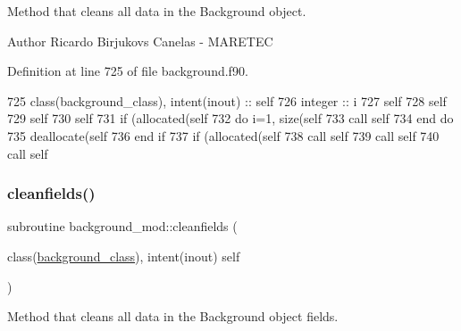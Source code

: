 Method that cleans all data in the Background object. 

\begin{DoxyAuthor}{Author}
Ricardo Birjukovs Canelas -\/ M\+A\+R\+E\+T\+EC 
\end{DoxyAuthor}


Definition at line 725 of file background.\+f90.


\begin{DoxyCode}
725     \textcolor{keywordtype}{class}(background\_class), \textcolor{keywordtype}{intent(inout)} :: self
726     \textcolor{keywordtype}{integer} :: i
727     self%
728     self%
729     self%
730     self%
731     \textcolor{keywordflow}{if} (\textcolor{keyword}{allocated}(self%
732         \textcolor{keywordflow}{do} i=1, \textcolor{keyword}{size}(self%
733             \textcolor{keyword}{call }self%
734 \textcolor{keywordflow}{        end do}
735         \textcolor{keyword}{deallocate}(self%
736 \textcolor{keywordflow}{    end if}
737     \textcolor{keywordflow}{if} (\textcolor{keyword}{allocated}(self%
738     \textcolor{keyword}{call }self%
739     \textcolor{keyword}{call }self%
740     \textcolor{keyword}{call }self%
\end{DoxyCode}
\mbox{\label{namespacebackground__mod_a843a471a68ce83809e3ed0a40886a4e7}} 
\subsubsection{\texorpdfstring{cleanfields()}{cleanfields()}}
{\footnotesize\ttfamily subroutine background\+\_\+mod\+::cleanfields (\begin{DoxyParamCaption}\item[{class(\mbox{\hyperlink{structbackground__mod_1_1background__class}{background\+\_\+class}}), intent(inout)}]{self }\end{DoxyParamCaption})\hspace{0.3cm}{\ttfamily [private]}}



Method that cleans all data in the Background object fields. 

